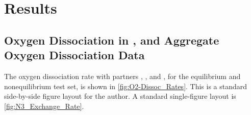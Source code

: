 \graphicspath{{./results/}}

\chapter{Results}
\label{sec:Results}

\section{Oxygen Dissociation in , and Aggregate Oxygen Dissociation Data}
\label{sec:O2_N2}
The oxygen dissociation rate with partners , , and , for the equilibrium and nonequilibrium test set,
   is shown in \cref{fig:O2-Dissoc_Rates}.
This is a standard side-by-side figure layout for the author.
A standard single-figure layout is \cref{fig:N3_Exchange_Rate}.

